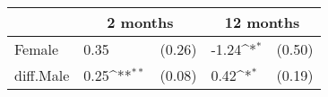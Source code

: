 {
\def\sym#1{\ifmmode^{#1}\else\(^{#1}\)\fi}
\begin{tabular*}{.65\hsize}{@{\hskip\tabcolsep\extracolsep\fill}l*{2}{lc}}
\toprule
                &\multicolumn{2}{c}{2 months}&\multicolumn{2}{c}{12 months}\\
\midrule
Female\hspace{7ex}&     0.35         &   (0.26)&    -1.24\sym{*}  &   (0.50)\\
diff.Male       &     0.25\sym{**} &   (0.08)&     0.42\sym{*}  &   (0.19)\\
\bottomrule
\end{tabular*}
}
